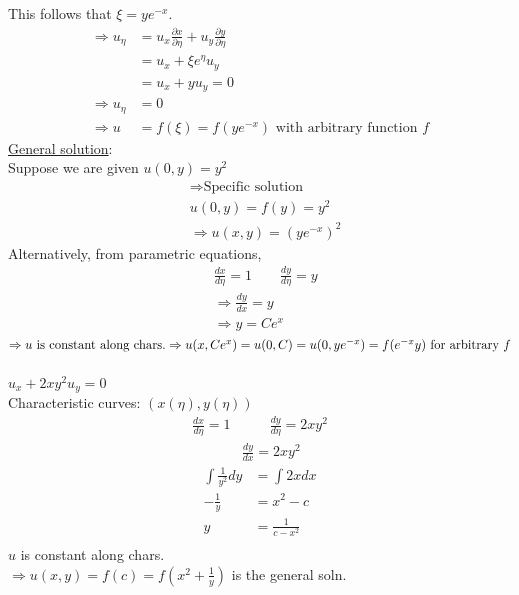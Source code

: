 \documentclass[12pt, letterpaper]{article}
\begin{document}
This follows that $\xi = ye^{-x}$. \\
\begin{align*}
    \Rightarrow u_\eta &= u_x \frac{\partial x}{\partial \eta} + u_y\frac{\partial y}{\partial \eta} \\
    &= u_x + \xi e^\eta u_y \\
    &= u_x + yu_y = 0 \\
    \Rightarrow u_\eta &= 0 \\
    \Rightarrow u &= f(\xi) = f(ye^{-x}) \text{ with arbitrary function }f
\end{align*}
\underline{General solution}:\\
Suppose we are given $u(0,y) = y^2$
\begin{align*}
    &\Rightarrow \text{Specific solution} \\
    &u(0,y) = f(y) = y^2 \\ 
    &\Rightarrow u(x,y) = (ye^{-x})^2
\end{align*}
Alternatively, from parametric equations,
\begin{align*}
    &\frac{dx}{d\eta} = 1 \qquad \frac{dy}{d\eta} = y \\
    &\Rightarrow \frac{dy}{dx} = y  \\
    &\Rightarrow y = Ce^{x}
\end{align*}
    $\Rightarrow u\ \text{is constant along chars.} \\
    \Rightarrow u(x,Ce^x) = u(0,C) \\
    = u(0,ye^{-x}) \\
    = f(e^{-x}y) \text{ for arbitrary }f$ \\ \\
 $u_x + 2xy^2u_y = 0$ \\
Characteristic curves: $(x(\eta), y(\eta))$
\begin{align*}
    \frac{dx}{d\eta} = 1 &\qquad \frac{dy}{d\eta} = 2xy^2 \\
    &\frac{dy}{dx} = 2xy^2
\end{align*} 
\begin{align*}
    \int \frac{1}{y^2}dy &= \int 2xdx \\
    -\frac{1}{y} &= x^2 - c \\
    y &= \frac{1}{c-x^2} \\ 
\end{align*}
$u$ is constant along chars. \\
$\Rightarrow u(x,y) = f(c) = f(x^2 + \frac 1y)$ is the general soln. \\ \\
\end{document}
